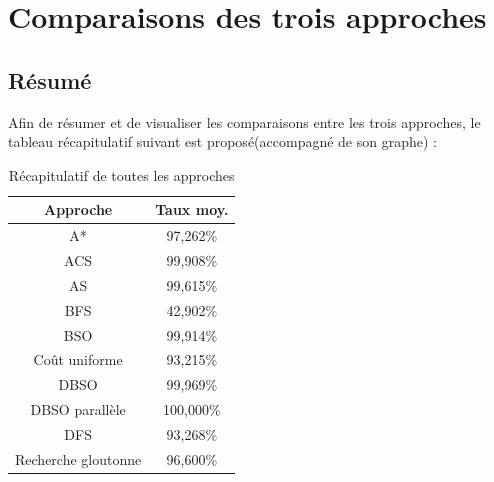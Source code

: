 \chapter*{Comparaisons des trois approches}

\section{Résumé}
Afin de résumer et de visualiser les comparaisons entre les trois approches, le tableau récapitulatif suivant est proposé(accompagné de son graphe) : 
\begin{table}[H]
	\centering
		\begin{tabular}{|c|c|}
			\hline
			\textbf{Approche}   & \textbf{Taux moy.} \\ \hline
			A*                  & 97,262\%           \\ \hline
			ACS                 & 99,908\%           \\ \hline
			AS                  & 99,615\%           \\ \hline
			\rowcolor[HTML]{FD6864} 
			BFS                 & 42,902\%           \\ \hline
			BSO                 & 99,914\%           \\ \hline
			Coût uniforme       & 93,215\%           \\ \hline
			DBSO                & 99,969\%           \\ \hline
			\rowcolor[HTML]{9AFF99} 
			DBSO parallèle      & 100,000\%          \\ \hline
			DFS                 & 93,268\%           \\ \hline
			Recherche gloutonne & 96,600\%           \\ \hline
		\end{tabular}%
	\caption{Récapitulatif de toutes les approches}
	\label{my-label}
\end{table}

